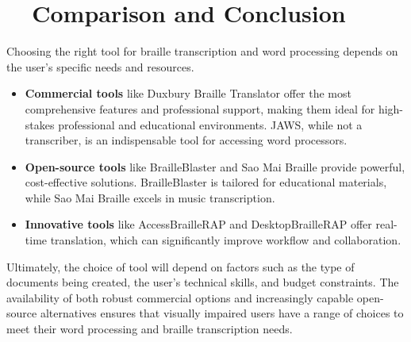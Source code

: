 \section{~~Comparison and Conclusion}\label{ch12:sec:conclusion}
Choosing the right tool for braille transcription and word processing depends on the user's specific needs and resources.
\begin{itemize}
	\item \textbf{Commercial tools} like Duxbury Braille Translator offer the most comprehensive features and professional support, making them ideal for high-stakes professional and educational environments. JAWS, while not a transcriber, is an indispensable tool for accessing word processors.
	\item \textbf{Open-source tools} like BrailleBlaster and Sao Mai Braille provide powerful, cost-effective solutions. BrailleBlaster is tailored for educational materials, while Sao Mai Braille excels in music transcription.
	\item \textbf{Innovative tools} like AccessBrailleRAP and DesktopBrailleRAP offer real-time translation, which can significantly improve workflow and collaboration.
\end{itemize}
Ultimately, the choice of tool will depend on factors such as the type of documents being created, the user's technical skills, and budget constraints. The availability of both robust commercial options and increasingly capable open-source alternatives ensures that visually impaired users have a range of choices to meet their word processing and braille transcription needs.
